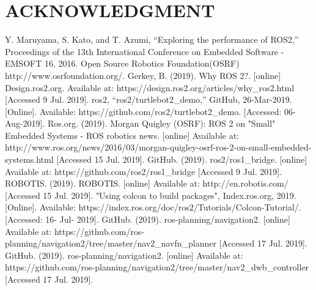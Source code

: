 \documentclass[letterpaper, 10 pt, conference]{ieeeconf}  %
\begin{document}
\section*{ACKNOWLEDGMENT}
\begin{thebibliography}{99}

 Y. Maruyama, S. Kato, and T. Azumi, “Exploring the performance of ROS2,” Proceedings of the 13th International Conference on Embedded Software - EMSOFT 16, 2016. 
 Open Source Robotics Foundation(OSRF) http://www.osrfoundation.org/.
 Gerkey, B. (2019). Why ROS 2?. [online] Design.ros2.org. Available at: https://design.ros2.org/articles/why\_ros2.html [Accessed 9 Jul. 2019].
 ros2, “ros2/turtlebot2\_demo,” GitHub, 26-Mar-2019. [Online]. Available: https://github.com/ros2/turtlebot2\_demo. [Accessed: 06-Aug-2019].
Ros.org. (2019). Morgan Quigley (OSRF): ROS 2 on "Small" Embedded Systems - ROS robotics news. [online] Available at: http://www.ros.org/news/2016/03/morgan-quigley-osrf-ros-2-on-small-embedded-systems.html [Accessed 15 Jul. 2019].
 GitHub. (2019). ros2/ros1\_bridge. [online] Available at: https://github.com/ros2/ros1\_bridge [Accessed 9 Jul. 2019].
 ROBOTIS. (2019). ROBOTIS. [online] Available at: http://en.robotis.com/ [Accessed 15 Jul. 2019].
 "Using colcon to build packages", Index.ros.org, 2019. [Online]. Available: https://index.ros.org/doc/ros2/Tutorials/Colcon-Tutorial/. [Accessed: 16- Jul- 2019].
 GitHub. (2019). ros-planning/navigation2. [online] Available at: https://github.com/ros-planning/navigation2/tree/master/nav2\_navfn\_planner [Accessed 17 Jul. 2019].
 GitHub. (2019). ros-planning/navigation2. [online] Available at: https://github.com/ros-planning/navigation2/tree/master/nav2\_dwb\_controller [Accessed 17 Jul. 2019].
\end{thebibliography}
\end{document}
